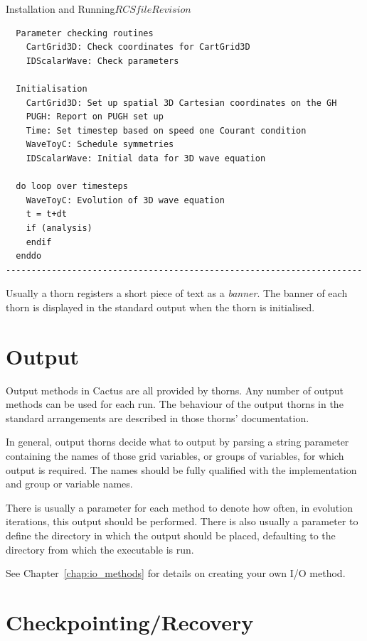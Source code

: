 \begin{cactuspart}{Installation and Running}{$RCSfile$}{$Revision$}
\begin{Lentry}
\begin{verbatim}
  Parameter checking routines
    CartGrid3D: Check coordinates for CartGrid3D
    IDScalarWave: Check parameters

  Initialisation
    CartGrid3D: Set up spatial 3D Cartesian coordinates on the GH
    PUGH: Report on PUGH set up
    Time: Set timestep based on speed one Courant condition
    WaveToyC: Schedule symmetries
    IDScalarWave: Initial data for 3D wave equation

  do loop over timesteps
    WaveToyC: Evolution of 3D wave equation
    t = t+dt
    if (analysis)
    endif
  enddo
----------------------------------------------------------------------
\end{verbatim}

\item [Thorn banners]
        Usually a thorn registers a short piece of text as a \emph{banner}.
        The banner of each thorn is displayed in the standard output when
        the thorn is initialised.

\end{Lentry}


\section{Output}
Output methods in Cactus are all provided by thorns.
Any number of output methods can be used for each run.
The behaviour of the output thorns in the
standard arrangements are described in those thorns' documentation.

In general, output thorns decide what to output by parsing a string parameter
containing the names of those grid variables, or groups of variables, for which
output is required. The names should be fully qualified with the
implementation and group or variable names.

There is usually a parameter for each method to denote how often, in evolution
iterations, this output should be performed.  There is also usually a parameter
to define the directory in which the output should be placed, defaulting to the
directory from which the executable is run.

See Chapter~\ref{chap:io_methods} for details on creating your own I/O method.



\section{Checkpointing/Recovery}
\label{sec:checkpointing}


\end{cactuspart}
